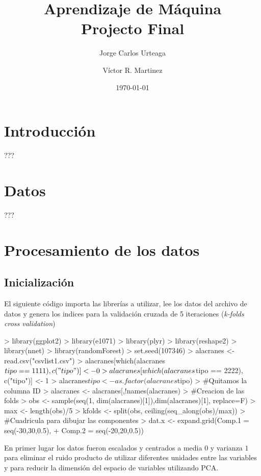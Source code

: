 \documentclass{article}
\author{Jorge Carlos Urteaga \and Víctor R. Martinez}
\title{Aprendizaje de Máquina \\ Projecto Final}
\date{\today}
\begin{document}


\maketitle

\section{Introducción}
???

\section{Datos}
???

\section{Procesamiento de los datos}

\subsection{Inicialización}
El siguiente código importa las librerías a utilizar, lee los datos del archivo de datos y genera los indices para la validación cruzada de 5 iteraciones (\emph{k-folds cross validation})
\begin{Schunk}
\begin{Sinput}
> library(ggplot2)
> library(e1071)
> library(plyr)
> library(reshape2)
> library(nnet)
> library(randomForest)
> set.seed(107346)
> alacranes <- read.csv("csvlist1.csv")
> alacranes[which(alacranes$tipo == 1111), c("tipo")] <- 0
> alacranes[which(alacranes$tipo == 2222), c("tipo")] <- 1
> alacranes$tipo <- as.factor(alacranes$tipo)
> #Quitamos la columna ID
> alacranes <- alacranes[,!names(alacranes) %
> #Creacion de las folds
> obs <- sample(seq(1, dim(alacranes)[1]),dim(alacranes)[1], replace=F)
> max <- length(obs)/5
> kfolds <- split(obs, ceiling(seq_along(obs)/max))
> #Cuadricula para dibujar las componentes
> dat.x <- expand.grid(Comp.1 = seq(-30,30,0.5),
+                      Comp.2 = seq(-20,20,0.5))
\end{Sinput}
\end{Schunk}

En primer lugar los datos fueron escalados y centrados a media $0$ y varianza $1$ para eliminar el ruido producto de utilizar diferentes unidades entre las variables y para reducir la dimensión del espacio de variables utilizando PCA.
\end{document}
